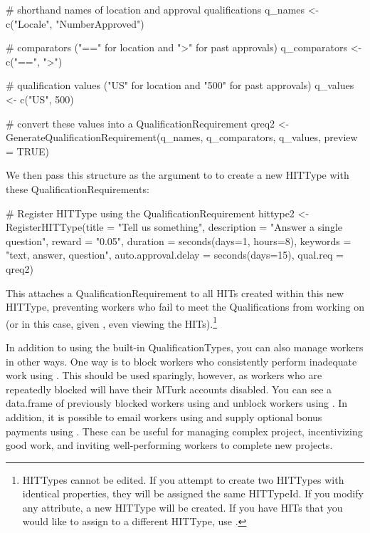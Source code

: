 \begin{example}
# shorthand names of location and approval qualifications
q_names <- c("Locale", "NumberApproved")

# comparators ("==" for location and ">" for past approvals)
q_comparators <- c("==", ">")

# qualification values ("US" for location and "500" for past approvals)
q_values <- c("US", 500)

# convert these values into a QualificationRequirement
qreq2 <- GenerateQualificationRequirement(q_names, 
                                          q_comparators, 
                                          q_values, 
                                          preview = TRUE)

\end{example}

\noindent We then pass this structure as the  argument to  to create a new HITType with these QualificationRequirements:

\begin{example}
# Register HITType using the QualificationRequirement
hittype2 <- RegisterHITType(title = "Tell us something", 
                            description = "Answer a single question", 
                            reward = "0.05", 
                            duration = seconds(days=1, hours=8), 
                            keywords = "text, answer, question", 
                            auto.approval.delay = seconds(days=15),
                            qual.req = qreq2)
\end{example}

\noindent This attaches a QualificationRequirement to all HITs created within this new HITType, preventing workers who fail to meet the Qualifications from working on (or in this case, given , even viewing the HITs).\footnote{HITTypes cannot be edited. If you attempt to create two HITTypes with identical properties, they will be assigned the same HITTypeId. If you modify any attribute, a new HITType will be created. If you have HITs that you would like to assign to a different HITType, use .} 

In addition to using the built-in QualificationTypes, you can also manage workers in other ways. One way is to block workers who consistently perform inadequate work using . This should be used sparingly, however, as workers who are repeatedly blocked will have their MTurk accounts disabled. You can see a data.frame of previously blocked workers using  and unblock workers using . In addition, it is possible to email workers using  and supply optional bonus payments using . These can be useful for managing complex project, incentivizing good work, and inviting well-performing workers to complete new projects.

